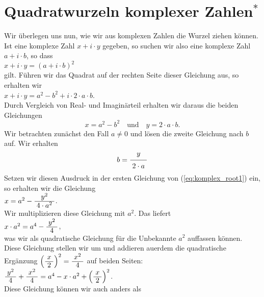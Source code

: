 \section{Quadratwurzeln komplexer Zahlen$^*$}
Wir \"{u}berlegen uns nun, wie wir aus komplexen Zahlen die Wurzel ziehen k\"{o}nnen.  Ist eine komplexe Zahl
$x + i \cdot y$ gegeben, so suchen wir also eine komplexe Zahl $a + i \cdot b$, so dass
\\[0.2cm]
\hspace*{1.3cm}
$x + i \cdot y = (a + i \cdot b)^2$
\\[0.2cm]
gilt.  F\"{u}hren wir das Quadrat auf der rechten Seite dieser Gleichung aus, so erhalten wir
\\[0.2cm]
\hspace*{1.3cm}
$x + i \cdot y = a^2 - b^2 + i \cdot 2 \cdot a \cdot b$.
\\[0.2cm]
Durch Vergleich von Real- und Imagin\"{a}rteil erhalten wir daraus die beiden Gleichungen
\begin{equation}
  \label{eq:komplex_root1}
  x = a^2 - b^2 \quad \mbox{und} \quad y = 2 \cdot a \cdot b.
\end{equation}
Wir betrachten zun\"{a}chst den Fall $a \not= 0$ und
l\"{o}sen die zweite Gleichung nach $b$ auf.  Wir erhalten
\begin{equation}
  \label{eq:komplex_root2}
  b = \bruch{y}{2 \cdot a}  
\end{equation}
Setzen wir diesen Ausdruck in der ersten Gleichung von (\ref{eq:komplex_root1}) ein, so erhalten wir die
Gleichung 
\\[0.2cm]
\hspace*{1.3cm}
$x = a^2 - \bruch{y^2}{4 \cdot a^2}$.
\\[0.2cm]
Wir multiplizieren diese Gleichung mit $a^2$. Das liefert 
\\[0.2cm]
\hspace*{1.3cm}
$x \cdot a^2 = a^4 - \bruch{y^2}{4}$,
\\[0.2cm] 
was wir als quadratische Gleichung f\"{u}r die  Unbekannte $a^2$ auffassen k\"{o}nnen.
 Diese Gleichung stellen wir um und addieren au\3erdem die quadratische Erg\"{a}nzung 
$\left(\bruch{x}{2}\right)^2 = \bruch{x^2}{4}$ auf 
beiden Seiten: 
\\[0.2cm]
\hspace*{1.3cm}
$\bruch{y^2}{4} + \bruch{x^2}{4} = a^4 - x \cdot a^2 + \left(\bruch{x}{2}\right)^2$.
\\[0.2cm]
Diese Gleichung k\"{o}nnen wir auch anders als
\\[0.2cm]
